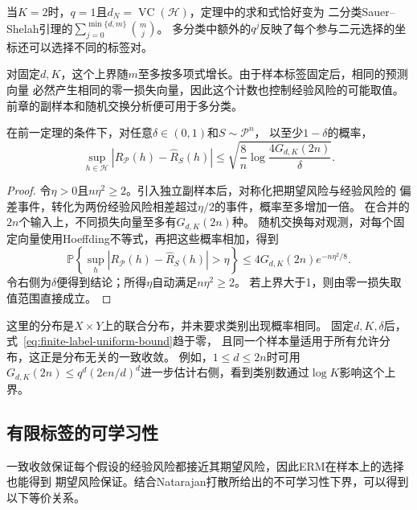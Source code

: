 当$K=2$时，$q=1$且$d_N=\operatorname{VC}(\mathcal H)$，定理中的求和式恰好变为
二分类Sauer--Shelah引理的$\sum_{j=0}^{\min\{d,m\}}\binom mj$。
多分类中额外的$q^j$反映了每个参与二元选择的坐标还可以选择不同的标签对。

对固定$d,K$，这个上界随$m$至多按多项式增长。由于样本标签固定后，相同的预测向量
必然产生相同的零一损失向量，因此这个计数也控制经验风险的可能取值。
前章的副样本和随机交换分析便可用于多分类。

\begingroup
{}
\begin{theorem}[有限标签的一致收敛保证]
\label{thm:finite-label-uniform-convergence}
在前一定理的条件下，对任意$\delta\in(0,1)$和$S\sim\mathcal P^n$，
以至少$1-\delta$的概率，
\begin{equation}
 \sup_{h\in\mathcal H}|R_{\mathcal P}(h)-\hat R_S(h)|
 \leq\sqrt{\frac8n\log\frac{4G_{d,K}(2n)}{\delta}}.
 \label{eq:finite-label-uniform-bound}
\end{equation}
\end{theorem}
\endgroup

\begin{proof}
令$\eta>0$且$n\eta^2\geq2$。引入独立副样本后，对称化把期望风险与经验风险的
偏差事件，转化为两份经验风险相差超过$\eta/2$的事件，概率至多增加一倍。
在合并的$2n$个输入上，不同损失向量至多有$G_{d,K}(2n)$种。
随机交换每对观测，对每个固定向量使用Hoeffding不等式，再把这些概率相加，得到
\[
 \mathbb P\!\left\{\sup_h|R_{\mathcal P}(h)-\hat R_S(h)|>\eta\right\}
 \leq4G_{d,K}(2n)e^{-n\eta^2/8}.
\]
令右侧为$\delta$便得到结论；所得$\eta$自动满足$n\eta^2\geq2$。
若上界大于1，则由零一损失取值范围直接成立。
\end{proof}

这里的分布是$X\times Y$上的联合分布，并未要求类别出现概率相同。
固定$d,K,\delta$后，式~\eqref{eq:finite-label-uniform-bound}趋于零，
且同一个样本量适用于所有允许分布，这正是分布无关的一致收敛。
例如，$1\leq d\leq2n$时可用
$G_{d,K}(2n)\leq q^d(2en/d)^d$进一步估计右侧，看到类别数通过$\log K$影响这个上界。

\subsection{有限标签的可学习性}

一致收敛保证每个假设的经验风险都接近其期望风险，因此ERM在样本上的选择也能得到
期望风险保证。结合Natarajan打散所给出的不可学习性下界，可以得到以下等价关系。

